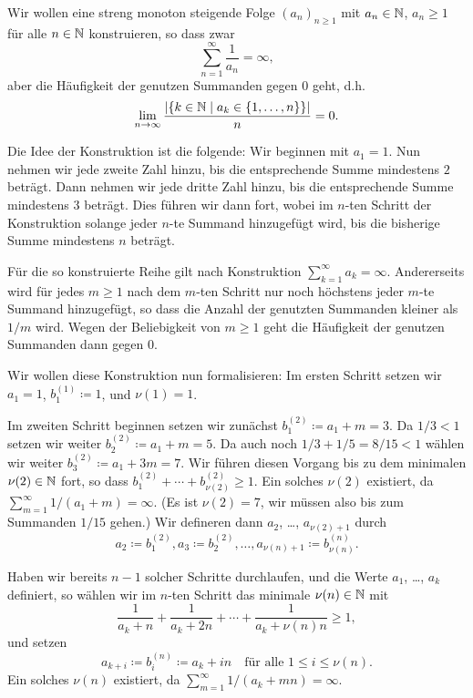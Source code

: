 \documentclass[a4paper,10pt]{article}
\begin{document}
Wir wollen eine streng monoton steigende Folge $(a_n)_{n \geq 1}$ mit $a_n \in \mathbb{N}$, $a_n \geq 1$ für alle $n \in \mathbb{N}$ konstruieren, so dass zwar
\[
 \sum_{n=1}^\infty \frac{1}{a_n} = \infty,
\]
aber die Häufigkeit der genutzen Summanden gegen $0$ geht, d.h.
\begin{equation}\label{eqn: Grenzwert}
 \lim_{n \to \infty} \frac{|\{k \in \mathbb{N} \mid a_k \in \{1, \dotsc, n\}\}|}{n} = 0.
\end{equation}

Die Idee der Konstruktion ist die folgende: Wir beginnen mit $a_1 = 1$. Nun nehmen wir jede zweite Zahl hinzu, bis die entsprechende Summe mindestens $2$ beträgt. Dann nehmen wir jede dritte Zahl hinzu, bis die entsprechende Summe mindestens $3$ beträgt. Dies führen wir dann fort, wobei im $n$-ten Schritt der Konstruktion solange jeder $n$-te Summand hinzugefügt wird, bis die bisherige Summe mindestens $n$ beträgt.

Für die so konstruierte Reihe gilt nach Konstruktion $\sum_{k=1}^\infty a_k = \infty$. Andererseits wird für jedes $m \geq 1$ nach dem $m$-ten Schritt nur noch höchstens jeder $m$-te Summand hinzugefügt, so dass die Anzahl der genutzten Summanden kleiner als $1/m$ wird. Wegen der Beliebigkeit von $m \geq 1$ geht die Häufigkeit der genutzen Summanden dann gegen $0$.

Wir wollen diese Konstruktion nun formalisieren: Im ersten Schritt setzen wir $a_1 = 1$, $b^{(1)}_1 \coloneqq 1$, und $\nu(1) = 1$.

Im zweiten Schritt beginnen setzen wir zunächst $b^{(2)}_1 \coloneqq a_1 + m = 3$. Da $1/3 < 1$ setzen wir weiter $b^{(2)}_2 \coloneqq a_1 + m = 5$. Da auch noch $1/3 + 1/5 = 8/15 < 1$ wählen wir weiter $b^{(2)}_3 \coloneqq a_1 + 3m = 7$. Wir führen diesen Vorgang bis zu dem minimalen $\nu(2) \in \mathbb{N}$ fort, so dass $b^{(2)}_1 + \dotsb + b^{(2)}_{\nu(2)} \geq 1$. Ein solches $\nu(2)$ existiert, da $\sum_{m=1}^\infty 1/(a_1 + m) = \infty$. (Es ist $\nu(2) = 7$, wir müssen also bis zum Summanden $1/15$ gehen.) Wir defineren dann $a_2$, \dots, $a_{\nu(2)+1}$ durch
\[
 a_2 \coloneqq b^{(2)}_1, a_3 \coloneqq b^{(2)}_2, \dotsc, a_{\nu(n)+1} \coloneqq b^{(n)}_{\nu(n)}.
\]

Haben wir bereits $n-1$ solcher Schritte durchlaufen, und die Werte $a_1$, \dots, $a_k$ definiert, so wählen wir im $n$-ten Schritt das minimale $\nu(n) \in \mathbb{N}$ mit
\[
 \frac{1}{a_k + n} + \frac{1}{a_k + 2n} + \dotsb + \frac{1}{a_k + \nu(n) n} \geq 1,
\]
und setzen
\[
 a_{k + i} \coloneqq b^{(n)}_i \coloneqq a_k + in \quad \text{für alle $1 \leq i \leq \nu(n)$}.
\]
Ein solches $\nu(n)$ existiert, da $\sum_{m=1}^\infty 1/(a_k + mn) = \infty$.
\end{document}
